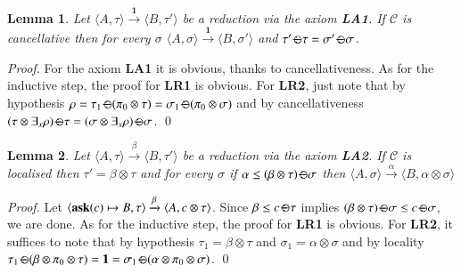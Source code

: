 \documentclass[preprint,12pt]{elsarticle}
\newtheorem{lemma}{Lemma}
\newtheorem{proof}{Proof}
\def\C{{\mathcal C}}
\newcommand{\ask}{{\bf ask}}
\def\monid{{\mathbf 0}}
\def\C{{\mathcal C}}
\def\odiv{\, {\ominus\hspace{-7.7pt} \div} \,}
\def\monid{\mathbf{1}}
\begin{document}
{\begin{lemma}
	\label{LA1}
	Let $\langle A, \tau \rangle \xrightarrow{\monid} \langle B, \tau' \rangle$ be a reduction 
	via the axiom {\bf LA1}. 
	If $\C$ is cancellative then 
	for every $\sigma$
	$\langle A, \sigma \rangle \xrightarrow{\monid} \langle B, \sigma' \rangle$
	and $\tau' \odiv \tau = \sigma' \odiv \sigma$.
\end{lemma}
\begin{proof}
	For the axiom {\bf LA1} it is obvious,
	thanks to cancellativeness.
	As for the inductive step, the proof for 
	{\bf LR1} is obvious. For {\bf LR2},
	just note that by hypothesis 
	$\rho = \tau_1 \odiv (\pi_0 \otimes \tau) = \sigma_1 \odiv (\pi_0 \otimes \sigma)$
	and by cancellativeness 
	$(\tau \otimes \exists_x \rho) \odiv \tau = (\sigma \otimes \exists_x \rho) \odiv \sigma$.
	\qed
\end{proof}


\begin{lemma}
	\label{LA2}
	Let $\langle A, \tau \rangle \xrightarrow{\beta} \langle B, \tau' \rangle$ be a reduction 
	via the axiom {\bf LA2}. If $\C$ is localised then $\tau' = \beta \otimes \tau$
	and for every $\sigma$ if $\alpha \leq (\beta \otimes \tau) \odiv \sigma$ then
	$\langle A, \sigma \rangle \xrightarrow{\alpha} \langle B, \alpha \otimes \sigma \rangle$
\end{lemma}
\begin{proof}
	Let $\langle \hbox{\ask}(c) \mapsto B, \tau \rangle \xrightarrow{\beta} \langle A, c \otimes \tau \rangle$.
	Since $\beta \leq c \odiv \tau$ implies 
	$(\beta \otimes \tau)\odiv \sigma \leq c \odiv \sigma$,
	we are done.
	As for the inductive step, the proof for 
	{\bf LR1} is obvious. For {\bf LR2},
	it suffices to note that by hypothesis 
	$\tau_1 = \beta \otimes \tau$ and $\sigma_1 = \alpha \otimes \sigma$
	and by locality 
	$\tau_1 \odiv (\beta \otimes \pi_0 \otimes \tau) = \monid = \sigma_1 \odiv (\alpha \otimes \pi_0 \otimes \sigma)$.
	\qed
\end{proof}

}
\end{document}
